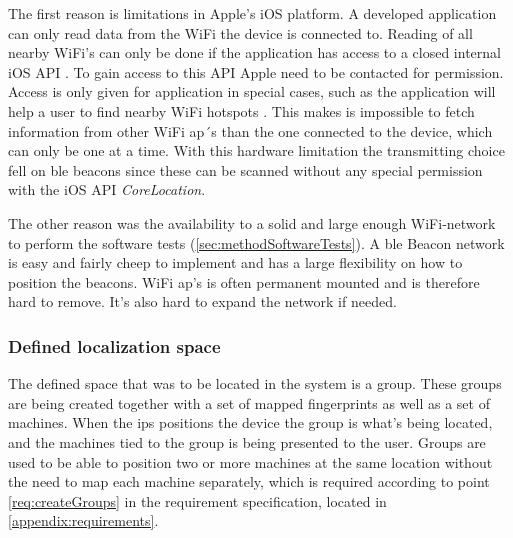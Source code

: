 \bigskip

The first reason is limitations in Apple's iOS platform.
A developed application can only read data from the WiFi the device is connected to.
Reading of all nearby WiFi's can only be done if the application has access to a closed internal iOS API \cite{NEHotspotHelperAppleDeveloper}.
To gain access to this API Apple need to be contacted for permission.
Access is only given for application in special cases, such as the application will help a user to find nearby WiFi hotspots \cite{TechnicalQA1942IOS}.
This makes is impossible to fetch information from other WiFi \acrshort{ap}´s than the one connected to the device, which can only be one at a time.
With this hardware limitation the transmitting choice fell on \acrshort{ble} beacons since these can be scanned without any special permission with the iOS API \textit{CoreLocation}.

\bigskip

The other reason was the availability to a solid and large enough WiFi-network to perform the software tests (\cref{sec:methodSoftwareTests}).
A \acrshort{ble} Beacon network is easy and fairly cheep to implement and has a large flexibility on how to position the beacons.
WiFi \acrshort{ap}'s is often permanent mounted and is therefore hard to remove.
It's also hard to expand the network if needed.


\subsubsection{Defined localization space}\label{sec:methodSoftwareDesignDefinedSpace} The defined space that was to be located in the system is a group.
These groups are being created together with a set of mapped fingerprints as well as a set of machines.
When the \acrshort{ips} positions the device the group is what's being located, and the machines tied to the group is being presented to the user.
Groups are used to be able to position two or more machines at the same location without the need to map each machine separately, which is required according to point \ref{req:createGroups} in the requirement specification, located in \cref{appendix:requirements}.
